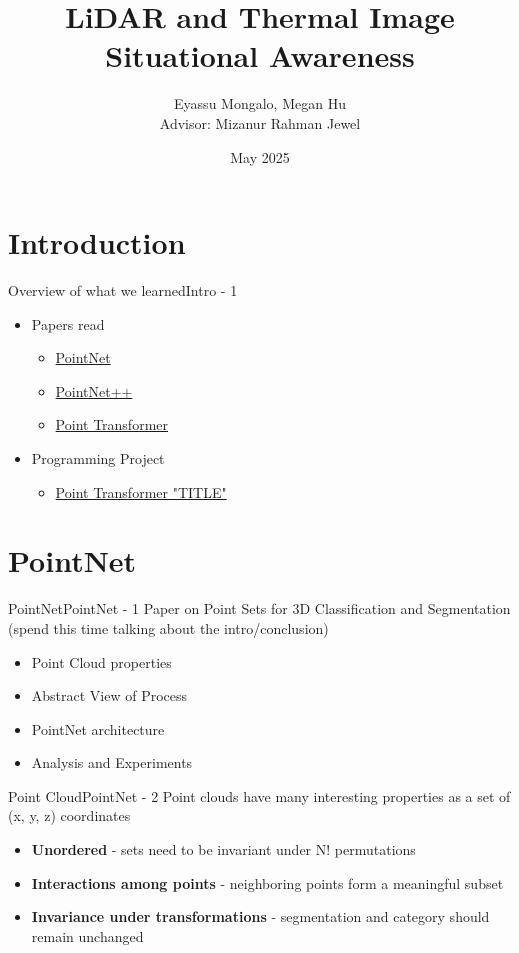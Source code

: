 \documentclass{beamer}
\title{LiDAR and Thermal Image Situational Awareness}
\author{\texorpdfstring{Eyassu Mongalo, Megan Hu \\ \small Advisor: Mizanur Rahman Jewel}
    {Eyassu Mongalo, Megan Hu, Advisor: Mizanur Rahman Jewel}}
\date{May 2025}
\begin{document}
	\maketitle
	\section{Introduction}
		\begin{frame}{Overview of what we learned}{Intro - 1}
			\begin{itemize}
				\item Papers read
				\begin{itemize}
					\item \href{https://arxiv.org/pdf/1612.00593}{PointNet}
					\item \href{https://arxiv.org/pdf/1706.02413}{PointNet++}
					\item \href{https://arxiv.org/pdf/2012.09164}{Point Transformer}
				\end{itemize}
				\item Programming Project
				\begin{itemize}
					\item \href{https://colab.research.google.com/drive/18-r47vgJSdtQkfIzKkadfpQtEpEf0Y9Q?usp=sharing}{Point Transformer "TITLE"}
				\end{itemize}
			\end{itemize}
		\end{frame}

	\section{PointNet}
		\begin{frame}{PointNet}{PointNet - 1}
			Paper on Point Sets for 3D Classification and Segmentation (spend this time talking about the intro/conclusion)
			\begin{itemize}
				\item Point Cloud properties
				\item Abstract View of Process
				\item PointNet architecture
				\item Analysis and Experiments
			\end{itemize}
		\end{frame}

		\begin{frame}{Point Cloud}{PointNet - 2}
			Point clouds have many interesting properties as a set of (x, y, z) coordinates
			\begin{itemize}
				\item \textbf{Unordered} - sets need to be invariant under N! permutations
				\item \textbf{Interactions among points} - neighboring points form a meaningful subset
				\item \textbf{Invariance under transformations} - segmentation and category should remain unchanged
			\end{itemize}
		\end{frame}
		
\end{document}
